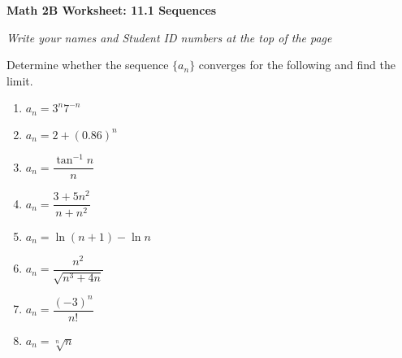 \documentclass[12pt,fleqn]{article}
\begin{document}
\begin{center}
	\textbf{Math 2B Worksheet: 11.1 Sequences}
\end{center}

\emph{Write your names and Student ID numbers at the top of the page}

Determine whether the sequence $\{a_n\}$ converges for the following and find the limit.
\begin{enumerate}
\item $a_n=3^n7^{-n}$\vfill


\item $a_n=2+(0.86)^n$\vfill

\item $a_n=\dfrac{\tan^{-1}n}{n}$\vfill

\item $a_n=\dfrac{3+5n^2}{n+n^2}$\vfill


\newpage



\item $a_n=\ln(n+1)-\ln n$\vfill

\item $a_n=\dfrac{n^2}{\sqrt{n^3+4n}}$\vfill

\item $a_n=\dfrac{(-3)^n}{n!}$\vfill

\item $a_n=\sqrt[n]{n}$\vfill



\end{enumerate}
\end{document}
